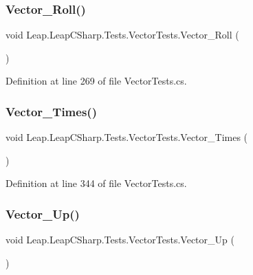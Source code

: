 \subsubsection{\texorpdfstring{Vector\_Roll()}{Vector\_Roll()}}
{\footnotesize\ttfamily void Leap.\+Leap\+C\+Sharp.\+Tests.\+Vector\+Tests.\+Vector\+\_\+\+Roll (\begin{DoxyParamCaption}{ }\end{DoxyParamCaption})}



Definition at line 269 of file Vector\+Tests.\+cs.

\mbox{\label{class_leap_1_1_leap_c_sharp_1_1_tests_1_1_vector_tests_abc55df5efcb4ca9db145115f877662df}} 
\subsubsection{\texorpdfstring{Vector\_Times()}{Vector\_Times()}}
{\footnotesize\ttfamily void Leap.\+Leap\+C\+Sharp.\+Tests.\+Vector\+Tests.\+Vector\+\_\+\+Times (\begin{DoxyParamCaption}{ }\end{DoxyParamCaption})}



Definition at line 344 of file Vector\+Tests.\+cs.

\mbox{\label{class_leap_1_1_leap_c_sharp_1_1_tests_1_1_vector_tests_af9b57edc72c60333e898e660a0e0591e}} 
\subsubsection{\texorpdfstring{Vector\_Up()}{Vector\_Up()}}
{\footnotesize\ttfamily void Leap.\+Leap\+C\+Sharp.\+Tests.\+Vector\+Tests.\+Vector\+\_\+\+Up (\begin{DoxyParamCaption}{ }\end{DoxyParamCaption})}




